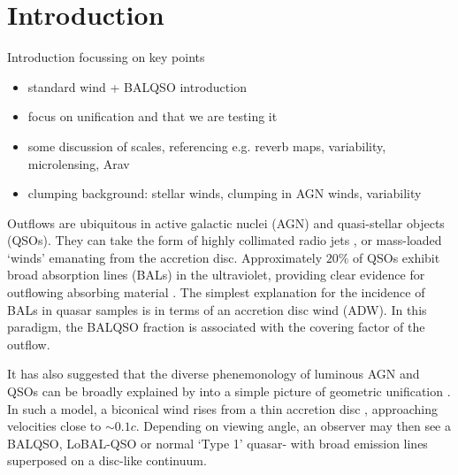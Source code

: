 \documentclass[useAMS,usenatbib]{mn2e_x}
\begin{document}



%
%

\section{Introduction}

Introduction focussing on key points

\begin{itemize}
\item standard wind + BALQSO introduction
\item focus on unification and that we are testing it
\item some discussion of scales, referencing e.g. reverb maps, variability, microlensing, Arav 
\item clumping background: stellar winds, clumping in AGN winds, variability
\end{itemize}

\clearpage

Outflows are ubiquitous in active galactic nuclei (AGN) and quasi-stellar objects (QSOs).
They can take the form of highly collimated radio jets \citep{bellonijet2010}, 
or mass-loaded `winds' emanating from the accretion disc. 
Approximately $20\%$ of QSOs exhibit broad absorption lines (BALs) in the ultraviolet,
providing clear evidence for outflowing absorbing material
\citep{weymann1991, knigge2008, turnermiller2009,allen2011}.
The simplest explanation for the incidence of 
BALs in quasar samples is in terms of an accretion disc wind (ADW). 
In this paradigm, the BALQSO fraction is associated with
the covering factor of the outflow.


It has also suggested that the  diverse phenemonology
of luminous AGN and QSOs can be broadly explained by
into a simple picture of geometric unification \citep[e.g.]{MCGV95, elvis2000}. 
In such a model, a biconical wind rises from 
a thin accretion disc \cite{shakurasunyaev1973}, approaching velocities
close to $\sim0.1c$. Depending on viewing angle, an observer 
may then see a BALQSO, LoBAL-QSO or normal `Type 1' quasar- with 
broad emission lines superposed on a disc-like continuum. 
\end{document}
